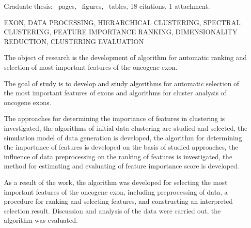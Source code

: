 Graduate thesis: \ pages, \totalfigures{}~figures, \totaltables{}\ tables,
18 citations, 1 attachment.

\vspace{\baselineskip}

EXON, DATA PROCESSING, HIERARCHICAL CLUSTERING, SPECTRAL CLUSTERING, FEATURE IMPORTANCE RANKING, DIMENSIONALITY REDUCTION, CLUSTERING EVALUATION

\vspace{\baselineskip}

The object of research is the development of algorithm for automatic ranking and selection of most important features of the oncogene exon.

The goal of study is to develop and study algorithms for automatic selection of the most important features of exons and algorithms for cluster analysis of oncogene exons.

The approaches for determining the importance of features in clustering is investigated, the algorithms of initial data clustering are studied and selected, the simulation model of data generation is developed, the algorithm for determining the importance of features is developed on the basis of studied approaches, the influence of data preprocessing on the ranking of features is investigated, the method for estimating and evaluating of feature importance score is developed.

As a result of the work, the algorithm was developed for selecting the most important features of the oncogene exon, including preprocessing of data, a procedure for ranking and selecting features, and constructing an interpreted selection result. Discussion and analysis of the data were carried out, the algorithm was evaluated.
